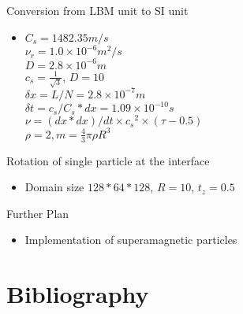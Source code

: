 \documentclass[a4paper,10pt]{article}
\begin{document}
Conversion from LBM unit to SI unit
\begin{itemize}
 \item
      $C_s = 1482.35 m/s $\\
      $\nu_r = 1.0 \times 10^{-6} m^2/s$\\
      $D=2.8 \times 10^{-6} m$\\
      $c_s = \frac{1}{\sqrt{3}}$, $D=10$ \\
      $\delta x= L/N = 2.8\times 10^{-7} m$  \\      
      $\delta t = c_s/C_s * dx = 1.09 \times 10^{-10} s$ \\
      $\nu = (dx*dx)/dt \times {c_s}^2\times (\tau -0.5) $\\
      $\rho =2, m= \frac{4}{3}\pi\rho R^3$       
         
\end{itemize}
Rotation of single particle at the interface
\begin{itemize}
 \item  Domain size $128*64*128$, $R=10$, $t_z=0.5$
\end{itemize}
Further Plan 
\begin{itemize}
 \item Implementation of superamagnetic particles
\end{itemize}

\section{Bibliography}


\end{document}
